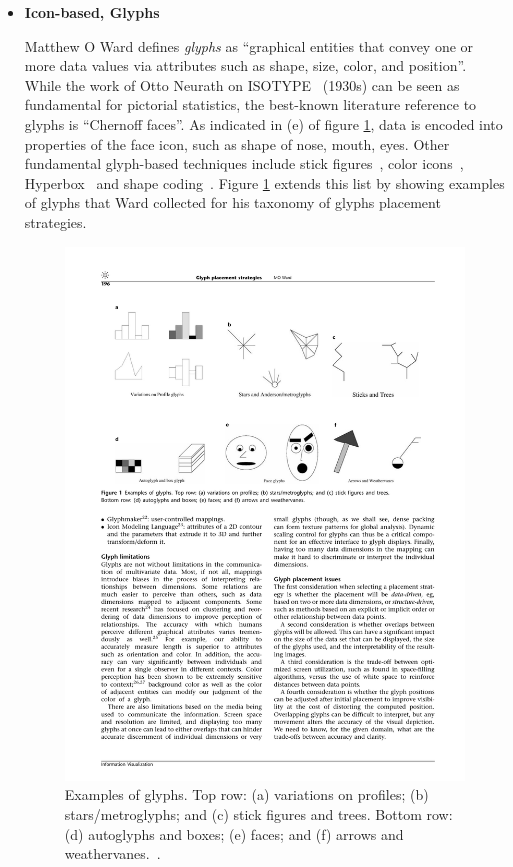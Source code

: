 \begin{itemize}

\item \textbf{Icon-based, Glyphs}

Matthew O Ward\cite{ward02glyphs} defines \textit{glyphs} as ``graphical entities that convey one or more data values via attributes such as shape, size, color, and position''. While the work of Otto Neurath on ISOTYPE~\cite{neurath} (1930s) can be seen as fundamental for pictorial statistics, the best-known literature reference to glyphs is ``Chernoff faces''\cite{chernoff73}. As indicated in (e) of figure \ref{fig:glyphs-ward}, data is encoded into properties of the face icon, such as shape of nose, mouth, eyes. Other fundamental glyph-based techniques include stick figures~\cite{stickfigures}, color icons~\cite{coloricons}, Hyperbox~\cite{hyperbox} and shape coding~\cite{shapecoding}. Figure \ref{fig:glyphs-ward} extends this list by showing examples of glyphs that Ward collected for his taxonomy of glyphs placement strategies\cite{ward02glyphs}.

\begin{figure}[h]
  \begin{center}
    \hspace*{-1cm}\includegraphics[width=1.2\textwidth]{figures/glyphs.pdf}
    \caption{Examples of glyphs. Top row: (a) variations on profiles; (b) stars/metroglyphs; and (c) stick figures and trees.
Bottom row: (d) autoglyphs and boxes; (e) faces; and (f) arrows and weathervanes.~\cite{ward02glyphs}.}
    \label{fig:glyphs-ward}
  \end{center}
\end{figure}


\end{itemize}
